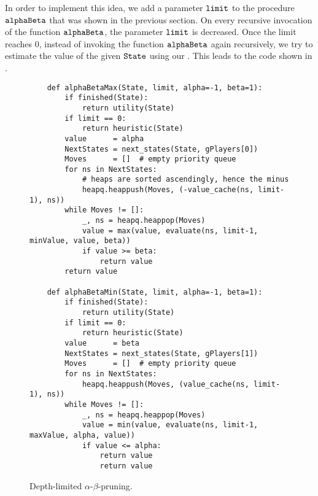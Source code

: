 In order to implement this idea, we add a parameter $\texttt{limit}$ to the procedure $\texttt{alphaBeta}$ that
was shown in the previous section.  On
every recursive invocation of the function $\texttt{alphaBeta}$, the parameter $\texttt{limit}$ is decreased.
Once the limit reaches $0$, instead of invoking the function $\texttt{alphaBeta}$ again recursively, we try to
estimate the value of 
the given $\texttt{State}$ using our .  This leads to the code shown in
. 


\begin{figure}[!ht]
\centering
\begin{verbatim}
    def alphaBetaMax(State, limit, alpha=-1, beta=1):
        if finished(State):
            return utility(State)
        if limit == 0:
            return heuristic(State)
        value      = alpha
        NextStates = next_states(State, gPlayers[0])
        Moves      = []  # empty priority queue
        for ns in NextStates:
            # heaps are sorted ascendingly, hence the minus
            heapq.heappush(Moves, (-value_cache(ns, limit-1), ns))
        while Moves != []:
            _, ns = heapq.heappop(Moves)
            value = max(value, evaluate(ns, limit-1, minValue, value, beta))
            if value >= beta:
                return value
        return value    

    def alphaBetaMin(State, limit, alpha=-1, beta=1):
        if finished(State):
            return utility(State)
        if limit == 0:
            return heuristic(State)
        value      = beta
        NextStates = next_states(State, gPlayers[1])
        Moves      = []  # empty priority queue
        for ns in NextStates:
            heapq.heappush(Moves, (value_cache(ns, limit-1), ns))
        while Moves != []:
            _, ns = heapq.heappop(Moves)
            value = min(value, evaluate(ns, limit-1, maxValue, alpha, value))
            if value <= alpha:
                return value
                return value
\end{verbatim}
\caption{Depth-limited $\alpha$-$\beta$-pruning.}
\label{fig:Game.ipynb}
\end{figure}
\FloatBarrier

